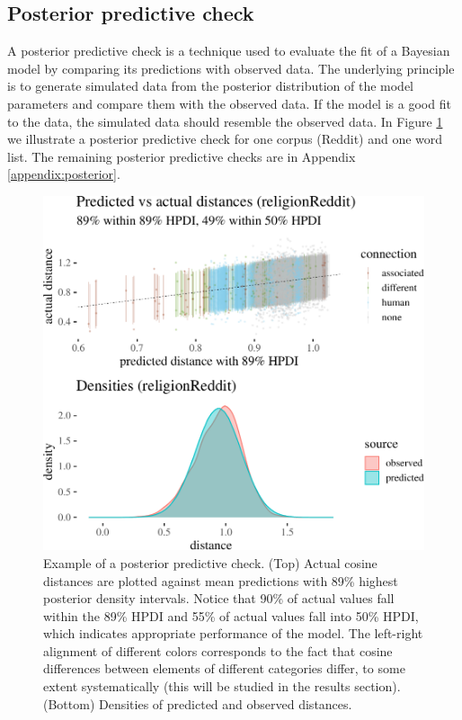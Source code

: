 \documentclass{clv3}
\begin{document}
\hypertarget{posterior-predictive-check}{%
\subsection{Posterior predictive
check}\label{posterior-predictive-check}}

\label{subsec:posterior}

A posterior predictive check is a technique used to evaluate the fit of
a Bayesian model by comparing its predictions with observed data. The
underlying principle is to generate simulated data from the posterior
distribution of the model parameters and compare them with the observed
data. If the model is a good fit to the data, the simulated data should
resemble the observed data. In Figure \ref{fig:posteriorCheck1} we
illustrate a posterior predictive check for one corpus (Reddit) and one
word list. The remaining posterior predictive checks are in Appendix 
\ref{appendix:posterior}.

\begin{figure}

\begin{center}\includegraphics[width=0.8\linewidth]{figures/figposteriorPrCheckA6b} \end{center}
\caption{Example of a posterior predictive check. (Top) Actual cosine distances are plotted against mean predictions with 89\% highest posterior density intervals. Notice that 90\% of actual values fall within the 89\% HPDI and 55\% of actual values fall into 50\% HPDI, which indicates appropriate performance of the model. The left-right alignment of different colors corresponds to the fact that cosine differences between elements of different categories differ, to some extent systematically (this will be studied in the results section). (Bottom) Densities of predicted and observed distances.}
\label{fig:posteriorCheck1}
\end{figure}
\end{document}
